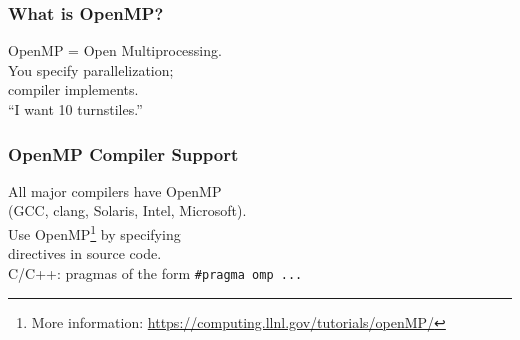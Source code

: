 \begin{frame}[containsverbatim]
  \frametitle{What is OpenMP?}

\vspace*{-3em}  
\Large
\begin{changemargin}{1.5cm}
    OpenMP = Open Multiprocessing.\\[2em]
    You specify parallelization; \\
    \hspace*{4em} compiler implements.\\[1em]
    ``I want 10 turnstiles.''
\end{changemargin}

\end{frame}

\begin{frame}[containsverbatim]
  \frametitle{OpenMP Compiler Support}
\vspace*{-3em}
\Large
\begin{changemargin}{1.5cm}
    All major compilers have OpenMP \\
    \qquad (GCC, clang, Solaris,
      Intel, Microsoft).\\[1em]

  Use OpenMP\footnote{More information:
    \url{https://computing.llnl.gov/tutorials/openMP/}} by specifying\\
  \hspace*{4em} directives in source code. \\[1em]
  C/C++: pragmas of the
  form \verb+#pragma omp ...+
\end{changemargin}
\end{frame}

